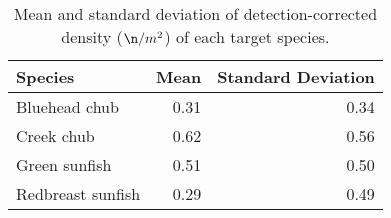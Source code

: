 \begin{table}[ht]
\centering
\caption{Mean and standard deviation of detection-corrected density ($\n/m^2$) of each target species.} 
\label{tab:density}
\begin{tabular}{lrr}
  \hline
Species & Mean & Standard Deviation \\ 
  \hline
Bluehead chub & 0.31 & 0.34 \\ 
  Creek chub & 0.62 & 0.56 \\ 
  Green sunfish & 0.51 & 0.50 \\ 
  Redbreast sunfish & 0.29 & 0.49 \\ 
   \hline
\end{tabular}
\end{table}
